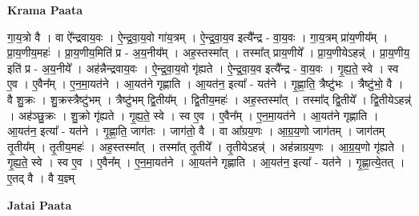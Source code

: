 \documentclass[17pt]{extarticle}
\begin{document}
\textbf{Krama Paata} \newline

गा॒य॒त्रो वै । वा ऐ᳚न्द्रवाय॒वः । ऐ॒न्द्र॒वा॒य॒वो गा॑य॒त्रम् । ऐ॒न्द्र॒वा॒य॒व इत्यै᳚न्द्र - वा॒य॒वः । गा॒य॒त्रम् प्रा॑य॒णीय᳚म् । प्रा॒य॒णीय॒महः॑ । प्रा॒य॒णीय॒मिति॑ प्र - अ॒य॒नीय᳚म् । अह॒स्तस्मा᳚त् । तस्मा᳚त् प्राय॒णीये᳚ । प्रा॒य॒णीयेऽहन्न्॑ । प्रा॒य॒णीय॒ इति॑ प्र - अ॒य॒नीये᳚ । अह॑न्नैन्द्रवाय॒वः । ऐ॒न्द्र॒वा॒य॒वो गृ॑ह्यते । ऐ॒न्द्र॒वा॒य॒व इत्यै᳚न्द्र - वा॒य॒वः । गृ॒ह्य॒ते॒ स्वे । स्व ए॒व । ए॒वैन᳚म् । ए॒न॒मा॒यत॑ने । आ॒यत॑ने गृह्णाति । आ॒यत॑न॒ इत्या᳚ - यत॑ने । गृ॒ह्णा॒ति॒ त्रैष्टु॑भः । त्रैष्टु॑भो॒ वै । वै शु॒क्रः । शु॒क्रस्त्रैष्टु॑भम् । त्रैष्टु॑भम् द्वि॒तीय᳚म् । द्वि॒तीय॒महः॑ । अह॒स्तस्मा᳚त् । तस्मा᳚द् द्वि॒तीये᳚ । द्वि॒तीयेऽहन्न्॑ । अह॑ञ्छु॒क्रः । शु॒क्रो गृ॑ह्यते । गृ॒ह्य॒ते॒ स्वे । स्व ए॒व । ए॒वैन᳚म् । ए॒न॒मा॒यत॑ने । आ॒यत॑ने गृह्णाति । आ॒यत॑न॒ इत्या᳚ - यत॑ने । गृ॒ह्णा॒ति॒ जाग॑तः । जाग॑तो॒ वै । वा आ᳚ग्रय॒णः । आ॒ग्र॒य॒णो जाग॑तम् । जाग॑तम् तृ॒तीय᳚म् । तृ॒तीय॒महः॑ । अह॒स्तस्मा᳚त् । तस्मा᳚त् तृ॒तीये᳚ । तृ॒तीयेऽहन्न्॑ । अह॑न्नाग्रय॒णः । आ॒ग्र॒य॒णो गृ॑ह्यते । गृ॒ह्य॒ते॒ स्वे । स्व ए॒व । ए॒वैन᳚म् । ए॒न॒मा॒यत॑ने । आ॒यत॑ने गृह्णाति । आ॒यत॑न॒ इत्या᳚ - यत॑ने । गृ॒ह्णा॒त्ये॒तत् । ए॒तद् वै । वै य॒ज्ञ्म् \newline

\textbf{Jatai Paata} \newline
\end{document}
